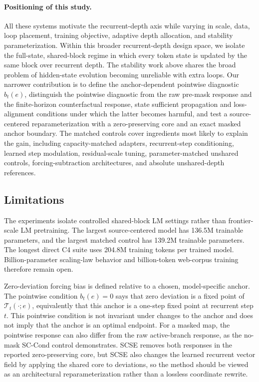 \documentclass[letterpaper]{article} %
\newcommand{\SCSE}{\textsc{SCSE}}
\newcommand{\Tmap}{\mathcal{T}}
\theoremstyle{remark}
\begin{document}
\paragraph{Positioning of this study.} All these systems motivate the recurrent-depth axis while varying in scale, data, loop placement, training objective, adaptive depth allocation, and stability parameterization.  Within this broader recurrent-depth design space, we isolate the full-state, shared-block regime in which every token state is updated by the same block over recurrent depth.  The stability work above shares the broad problem of hidden-state evolution becoming unreliable with extra loops.  Our narrower contribution is to define the anchor-dependent pointwise diagnostic $b_t(e)$, distinguish the pointwise diagnostic from the raw pre-mask response and the finite-horizon counterfactual response, state sufficient propagation and loss-alignment conditions under which the latter becomes harmful, and test a source-centered reparameterization with a zero-preserving core and an exact masked anchor boundary.  The matched controls cover ingredients most likely to explain the gain, including capacity-matched adapters, recurrent-step conditioning, learned step modulation, residual-scale tuning, parameter-matched unshared controls, forcing-subtraction architectures, and absolute unshared-depth references.

\subsection{Limitations}
The experiments isolate controlled shared-block LM settings rather than frontier-scale LM pretraining.  The largest source-centered model has 136.5M trainable parameters, and the largest matched control has 139.2M trainable parameters.  The longest direct C4 suite uses 204.8M training tokens per trained model.  Billion-parameter scaling-law behavior and billion-token web-corpus training therefore remain open.

Zero-deviation forcing bias is defined relative to a chosen, model-specific anchor.  The pointwise condition $b_t(e)=0$ says that zero deviation is a fixed point of $\Tmap_t(\cdot;e)$, equivalently that this anchor is a one-step fixed point at recurrent step $t$.  This pointwise condition is not invariant under changes to the anchor and does not imply that the anchor is an optimal endpoint.  For a masked map, the pointwise response can also differ from the raw active-branch response, as the no-mask SC-Cond control demonstrates.  \SCSE{} removes both responses in the reported zero-preserving core, but \SCSE{} also changes the learned recurrent vector field by applying the shared core to deviations, so the method should be viewed as an architectural reparameterization rather than a lossless coordinate rewrite.
\end{document}
